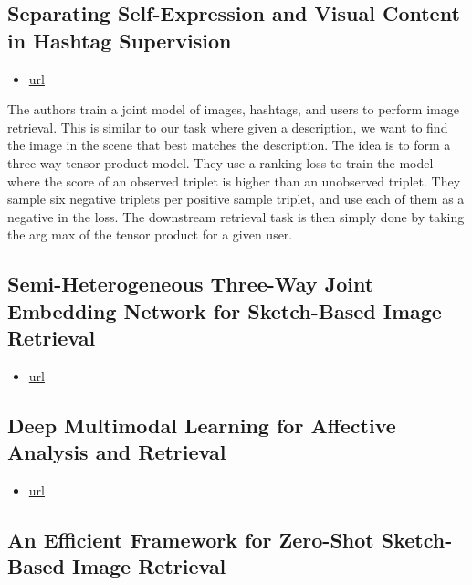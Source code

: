 \documentclass[11pt]{article}
\begin{document}
\subsection{Separating Self-Expression and Visual Content in Hashtag Supervision}

\begin{itemize}
\item \href{https://openaccess.thecvf.com/content\_cvpr\_2018/papers/Veit\_Separating\_Self-Expression\_and\_CVPR\_2018\_paper.pdf}{url}
\end{itemize}

The authors train a joint model of images, hashtags, and users to perform image retrieval. This is similar to our task where given a description, we want to find the image in the scene that best matches the description. The idea is to form a three-way tensor product model. They use a ranking loss to train the model where the score of an observed triplet is higher than an unobserved triplet. They sample six negative triplets per positive sample triplet, and use each of them as a negative in the loss.
The downstream retrieval task is then simply done by taking the arg max of the tensor product for a given user.



\subsection{Semi-Heterogeneous Three-Way Joint Embedding Network for Sketch-Based Image Retrieval}

\begin{itemize}
\item \href{https://ieeexplore.ieee.org/document/8809264}{url}
\end{itemize}

\subsection{Deep Multimodal Learning for Affective Analysis and Retrieval}

\begin{itemize}
\item \href{https://ieeexplore.ieee.org/abstract/document/7277066?casa\_token=aBp6BxcszHwAAAAA:3NoMiFrZbn7tXfavF1rgkCiGWbFI2arxn8Xb6iDF79q4zBZHWi7PWWhf6xW-xJwYdFALbmRENo4}{url}
\end{itemize}

\subsection{An Efficient Framework for Zero-Shot Sketch-Based Image Retrieval}
\end{document}
